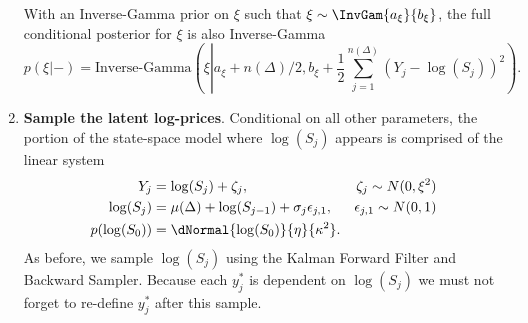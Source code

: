 \begin{enumerate}
  With an Inverse-Gamma prior on $\xi$ such that $\xi \sim \InvGam{a_\xi}{b_\xi}$, the full conditional posterior for $\xi$ is also Inverse-Gamma
\[ p(\xi | - ) = \mbox{Inverse-Gamma}\left( \xi \left|  a_\xi + n(\Delta)/2 , b_\xi + \frac{1}{2}\sum_{j=1}^{n(\Delta)} ( Y_j - \log(S_j) )^2 \right. \right). \]
	\item \textbf{Sample the latent log-prices}.  Conditional on all other parameters, the portion of the state-space model where $\log(S_j)$ appears is comprised of the linear system
\begin{align*}
	Y_j &= \log(S_j) + \zeta_j, & \zeta_j \sim N(0,\xi^2) \\
	\log(S_{j}) &= \mu(\Delta) + \log(S_{j-1}) + \sigma_{j} \epsilon_{j,1}, & \epsilon_{j,1} \sim N(0,1)  \\
	p(\log(S_0)) &= \dNormal{\log(S_0)}{\eta}{\kappa^2}.
\end{align*}
As before, we sample $\log(S_j)$ using the Kalman Forward Filter and Backward Sampler. Because each $y_j^*$ is dependent on $\log(S_j)$ we must not forget to re-define $y_j^*$ after this sample.



\end{enumerate}
